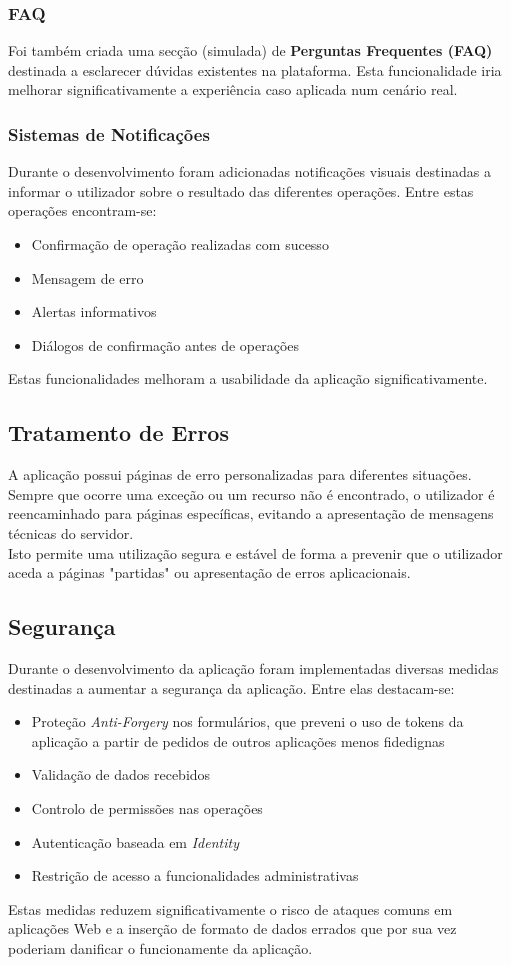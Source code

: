 \documentclass[12pt]{article}
\begin{document}
\subsubsection{FAQ}
Foi também criada uma secção (simulada) de \textbf{Perguntas Frequentes (FAQ)} destinada a esclarecer dúvidas existentes na plataforma. Esta funcionalidade iria melhorar significativamente a experiência caso aplicada num cenário real.
\subsubsection{Sistemas de Notificações}
Durante o desenvolvimento foram adicionadas notificações visuais destinadas a informar o utilizador sobre o resultado das diferentes operações. Entre estas operações encontram-se:
\begin{itemize}
    \item Confirmação de operação realizadas com sucesso
    \item Mensagem de erro
    \item Alertas informativos
    \item Diálogos de confirmação antes de operações
\end{itemize}
Estas funcionalidades melhoram a usabilidade da aplicação significativamente.
\subsection{Tratamento de Erros}
A aplicação possui páginas de erro personalizadas para diferentes situações.\\
Sempre que ocorre uma exceção ou um recurso não é encontrado, o utilizador é reencaminhado para páginas específicas, evitando a apresentação de mensagens técnicas do servidor.\\
Isto permite uma utilização segura e estável de forma a prevenir que o utilizador aceda a páginas "partidas" ou apresentação de erros aplicacionais.
\subsection{Segurança}
Durante o desenvolvimento da aplicação foram implementadas diversas medidas destinadas a aumentar a segurança da aplicação. Entre elas destacam-se:
\begin{itemize}
    \item Proteção \emph{Anti-Forgery} nos formulários, que preveni o uso de tokens da aplicação a partir de pedidos de outros aplicações menos fidedignas
    \item Validação de dados recebidos
    \item Controlo de permissões nas operações
    \item Autenticação baseada em \emph{Identity}
    \item Restrição de acesso a funcionalidades administrativas
\end{itemize}
Estas medidas reduzem significativamente o risco de ataques comuns em aplicações Web e a inserção de formato de dados errados que por sua vez poderiam danificar o funcionamente da aplicação.
\end{document}
